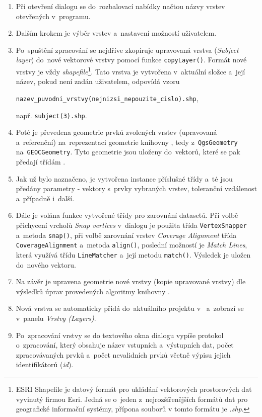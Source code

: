 \begin{enumerate}
 \item Při otevření dialogu se do~rozbalovací nabídky načtou názvy vrstev 
	otevřených v~programu.
 \item Dalším krokem je výběr vrstev a~nastavení možností uživatelem.
 \item Po~spuštění zpracování se nejdříve zkopíruje upravovaná vrstva 
	(\textit{Subject layer}) do~nové vektorové vrstvy pomocí funkce 
	\texttt{copyLayer()}. Formát nové vrstvy je vždy 
	\textit{shapefile}\footnote{ESRI Shapefile je datový formát pro ukládání 
	vektorových prostorových dat  vyvinutý firmou Esri. Jedná se o~jeden 
	  z~nejrozšířenějších formátů dat pro geografické informační systémy,
	  přípona souborů v tomto formátu je \textit{.shp}.}.
	Tato vrstva je vytvořena v~aktuální složce a~její název, pokud není
	zadán uživatelem, odpovídá vzoru
	\begin{center}
	 \texttt{nazev\_puvodni\_vrstvy(nejnizsi\_nepouzite\_cislo).shp},
	\end{center}
	např. \texttt{subject(3).shp}.
 \item Poté je převedena geometrie prvků zvolených vrstev (upravovaná
	a~referenční) na~reprezentaci geometrie knihovny ,
	tedy z~\texttt{Qgs\-Geo\-metry} na~\texttt{GEOC\-Geo\-metry}. 
	Tyto geometrie 	jsou uloženy do~vektorů, které se pak předají 
	třídám .
 \item Jak už bylo naznačeno, je vytvořena instance příslušné třídy 
	 a~té jsou předány parametry - vektory s~prvky vybraných
	vrstev, toleranční vzdálenost a~případně i~další. 
 \item Dále je volána funkce vytvořené třídy pro zarovnání datasetů. Při volbě 
	při\-chycení vrcholů \textit{Snap vertices} v~dialogu je použita třída 
	\texttt{Vertex\-Snapper} a~metoda \texttt{snap()}, při volbě zarovnání 
	vrstev \textit{Coverage Alignment} třída \texttt{Cove\-rage\-Align\-ment} 
	a~metoda \texttt{align()}, poslední možností je \textit{Match Lines}, která
	využívá třídu \texttt{Line\-Matcher} a~její metodu \texttt{match()}. 
	Výsledek je uložen do~nového vektoru.
 \item Na závěr je upravena geometrie nové vrstvy (kopie upravované vrstvy) dle
	vý\-sledků úprav provedených algoritmy knihovny .
 \item Nová vrstva se automaticky přidá do~aktuálního projektu v~ 
	a~zobrazí se v~panelu \textit{Vrstvy (Layers)}.
 \item Po~zpracování vrstvy se do textového okna dialogu vypíše protokol 
	o~zpracování, který obsahuje název vstupních a~výstupních dat, počet
	zpracovávaných prvků a~počet nevalidních prvků včetně výpisu jejich
	identifikátorů (\textit{id}).
\end{enumerate}





 

